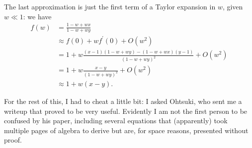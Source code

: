 \documentclass[14pt, a4paper, justified]{article}
\begin{document}
The last approximation is just the first term of a Taylor expansion in $w$, given $w \ll 1$: we have
\begin{equation}
    \begin{split}
        f(w) & = \frac{1 - w + wx}{1 - w + wy}
        \\
        & \approx f(0) + w f^\prime(0) + O(w^2)
        \\
        & = 1 + w \frac{(x - 1)(1 - w + wy) - (1 - w + wx)(y - 1)}{(1 - w + wy)^2} + O(w^2)
        \\
        & = 1 + w \frac{x - y}{(1 - w + wy)^2} + O(w^2)
        \\
        & \approx 1 + w(x-y).
    \end{split}
    \label{eq:taylor_trick}
\end{equation}

For the rest of this, I had to cheat a little bit: I asked Ohtsuki, who sent me a writeup that proved to be very useful.
Evidently I am not the first person to be confused by his paper, including several equations that (apparently) took multiple pages of algebra to derive but are, for space reasons, presented without proof.
\end{document}
